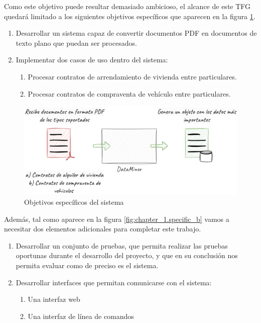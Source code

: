 Como este objetivo puede resultar demasiado ambicioso, el alcance de este TFG quedará limitado a los siguientes
objetivos específicos que aparecen en la figura \ref{fig:chapter_1.specific_a}.

\begin{enumerate}
    \item
    Desarrollar un sistema capaz de convertir documentos PDF en documentos de texto plano que puedan ser procesados.
    \item Implementar dos casos de uso dentro del sistema:
    \begin{enumerate}
        \item Procesar contratos de arrendamiento de vivienda entre particulares.
        \item Procesar contratos de compraventa de vehículo entre particulares.
    \end{enumerate}
\end{enumerate}

\begin{figure}[ht]
    \begin{center}
        \includegraphics[width=\textwidth]{chapter/1/images/chapter_1.specific_a}
        \caption{Objetivos específicos del sistema}
        \label{fig:chapter_1.specific_a}
    \end{center}
\end{figure}

Además, tal como aparece en la figura \ref{fig:chapter_1.specific_b} vamos a necesitar dos elementos adicionales para
completar este trabajo.

\begin{enumerate}
    \item Desarrollar un conjunto de pruebas, que permita realizar las pruebas oportunas durante el desarrollo del
    proyecto, y que en su conclusión nos permita evaluar como de preciso es el sistema.
    \item Desarrollar interfaces que permitan comunicarse con el sistema:
    \begin{enumerate}
        \item  Una interfaz web
        \item  Una interfaz de línea de comandos
    \end{enumerate}
\end{enumerate}

